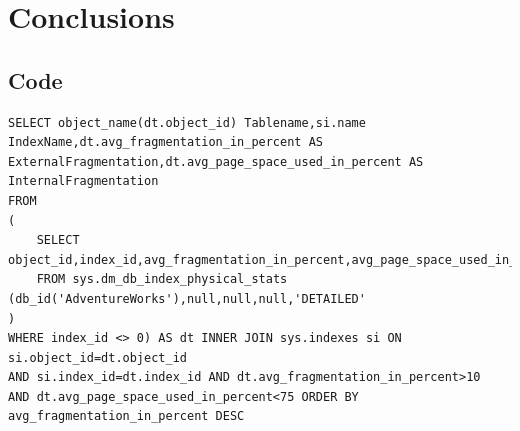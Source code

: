 \documentclass{cslthse-msc}
\begin{document}
\chapter{Conclusions}




\begin{appendices}

\chapter{Code}
\begin{lstlisting}[caption={Algorithm to find fragmented tables and the fragmentation values.},label=See DB-Fragmentation]
SELECT object_name(dt.object_id) Tablename,si.name
IndexName,dt.avg_fragmentation_in_percent AS
ExternalFragmentation,dt.avg_page_space_used_in_percent AS
InternalFragmentation
FROM
(
    SELECT object_id,index_id,avg_fragmentation_in_percent,avg_page_space_used_in_percent
    FROM sys.dm_db_index_physical_stats (db_id('AdventureWorks'),null,null,null,'DETAILED'
)
WHERE index_id <> 0) AS dt INNER JOIN sys.indexes si ON si.object_id=dt.object_id
AND si.index_id=dt.index_id AND dt.avg_fragmentation_in_percent>10
AND dt.avg_page_space_used_in_percent<75 ORDER BY avg_fragmentation_in_percent DESC
\end{lstlisting}
\label{lst:fragalg}
\end{appendices}
\end{document}
